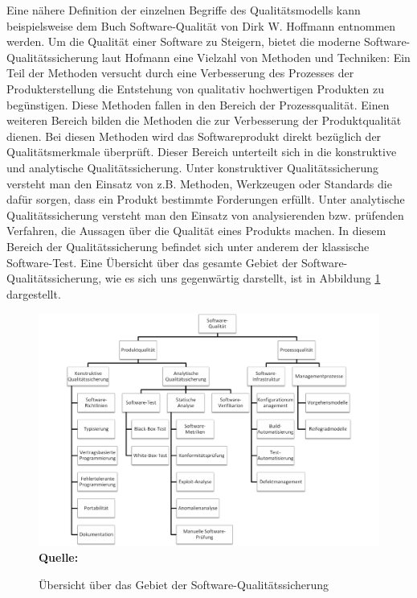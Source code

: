 Eine nähere Definition der einzelnen Begriffe des Qualitätsmodells kann beispielsweise dem Buch Software-Qualität von Dirk W. Hoffmann \cite[S.7 ff.]{hoffmann_software-qualitat_2013} entnommen werden. 
Um die Qualität einer Software zu Steigern, bietet die moderne Software-Qualitätssicherung laut Hofmann \cite[vgl. S.19 ff.]{hoffmann_software-qualitat_2013} eine Vielzahl von Methoden und Techniken:
Ein Teil der Methoden versucht durch eine Verbesserung des Prozesses der Produkterstellung die Entstehung von qualitativ hochwertigen Produkten zu begünstigen. Diese Methoden fallen in den Bereich der Prozessqualität.
Einen weiteren Bereich bilden die Methoden die zur Verbesserung der Produktqualität dienen. Bei diesen Methoden wird das Softwareprodukt direkt bezüglich der Qualitätsmerkmale überprüft. Dieser Bereich unterteilt sich in die konstruktive und analytische Qualitätssicherung. Unter konstruktiver Qualitätssicherung versteht man den Einsatz von z.B. Methoden, Werkzeugen oder Standards die
dafür sorgen, dass ein Produkt bestimmte Forderungen erfüllt. 
Unter analytische Qualitätssicherung versteht man den Einsatz von analysierenden bzw. prüfenden Verfahren, die Aussagen
über die Qualität eines Produkts machen.
In diesem Bereich der Qualitätssicherung befindet sich unter anderem der klassische Software-Test. Eine Übersicht über das gesamte Gebiet der Software-Qualitätssicherung, wie es sich uns gegenwärtig darstellt, ist in Abbildung \ref{fig:softwareQualitätssicherung} dargestellt. 
\begin{figure}[htb]
  \centering  
  \includegraphics[scale=0.7]{img/softwarequalitaet.png}\\
  \footnotesize\sffamily\textbf{Quelle:} \cite[vgl. S.20]{hoffmann_software-qualitat_2013}
  \caption{Übersicht über das Gebiet der Software-Qualitätssicherung}
  \label{fig:softwareQualitätssicherung}
\end{figure}



